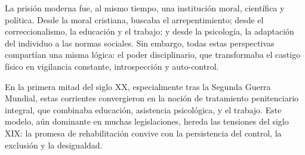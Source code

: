 \documentclass[
  spanish,
  letterpaper,
  DIV=11,
  numbers=noendperiod]{scrreprt}
\begin{document}
La prisión moderna fue, al mismo tiempo, una institución moral,
científica y política. Desde la moral cristiana, buscaba el
arrepentimiento; desde el correccionalismo, la educación y el trabajo; y
desde la psicología, la adaptación del individuo a las normas sociales.
Sin embargo, todas estas perspectivas compartían una misma lógica: el
poder disciplinario, que transformaba el castigo físico en vigilancia
constante, introspección y auto-control.

En la primera mitad del siglo XX, especialmente tras la Segunda Guerra
Mundial, estas corrientes convergieron en la noción de tratamiento
penitenciario integral, que combinaba educación, asistencia psicológica,
y el trabajo. Este modelo, aún dominante en muchas legislaciones, hereda
las tensiones del siglo XIX: la promesa de rehabilitación convive con la
persistencia del control, la exclusión y la desigualdad.
\end{document}
